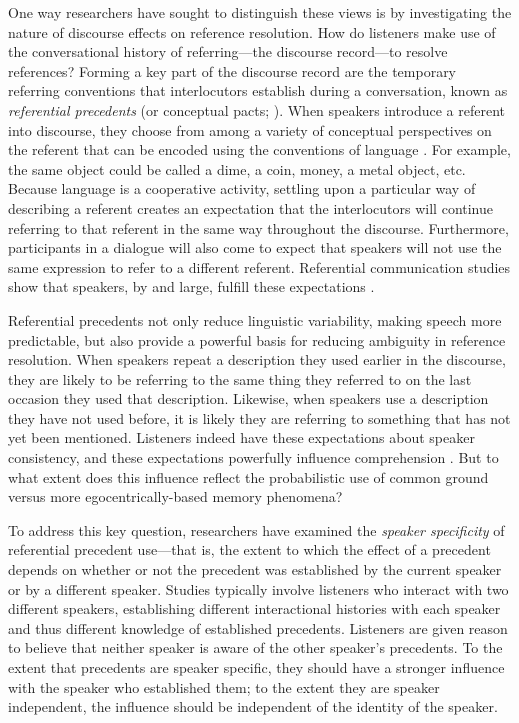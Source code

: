 \documentclass[doc,fignum,apacite,floatsintext]{apa6}
\begin{document}
One way researchers have sought to distinguish these views is by investigating the nature of discourse effects on reference resolution.  How do listeners make use of the conversational history of referring---the discourse record---to resolve references?  Forming a key part of the discourse record are the temporary referring conventions that interlocutors establish during a conversation, known as \textit{referential precedents} (or conceptual pacts; ).  When speakers introduce a referent into discourse, they choose from among a variety of conceptual perspectives on the referent that can be encoded using the conventions of language \cite{brown58}.  For example, the same object could be called a dime, a coin, money, a metal object, etc.  Because language is a cooperative activity, settling upon a particular way of describing a referent creates an expectation that the interlocutors will continue referring to that referent in the same way throughout the discourse.  Furthermore, participants in a dialogue will also come to expect that speakers will not use the same expression to refer to a different referent.  Referential communication studies show that speakers, by and large, fulfill these expectations \cite{brennanclark96,GannBarr2014,VanDerWege2009}.

Referential precedents not only reduce linguistic variability, making speech more predictable, but also provide a powerful basis for reducing ambiguity in reference resolution.  When speakers repeat a description they used earlier in the discourse, they are likely to be referring to the same thing they referred to on the last occasion they used that description.  Likewise, when speakers use a description they have not used before, it is likely they are referring to something that has not yet been mentioned.  Listeners indeed have these expectations about speaker consistency, and these expectations powerfully influence comprehension \cite{barrkeysar02,metzingbrennan03}.  But to what extent does this influence reflect the probabilistic use of common ground versus more egocentrically-based memory phenomena?

To address this key question, researchers have examined the \textit{speaker specificity} of referential precedent use---that is, the extent to which the effect of a precedent depends on whether or not the precedent was established by the current speaker or by a different speaker.  Studies typically involve listeners who interact with two different speakers, establishing different interactional histories with each speaker and thus different knowledge of established precedents.  Listeners are given reason to believe that neither speaker is aware of the other speaker's precedents.  To the extent that precedents are speaker specific, they should have a stronger influence with the speaker who established them; to the extent they are speaker independent, the influence should be independent of the identity of the speaker.
\end{document}
